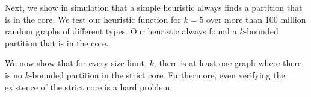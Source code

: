 \documentclass[sigconf]{aamas}
\begin{document}
Next, we show in simulation that a simple heuristic always finds a partition that is in the core.
%
We test our heuristic function for $k=5$ over more than $100$ million random graphs of different types. 
Our heuristic always found a $k$-bounded partition that is in the core. %

We now show that for every size limit, $k$, there is at least one graph where there is no $k$-bounded partition in the strict core.
%
Furthermore, even verifying the existence of the strict core is a hard problem.
\end{document}
